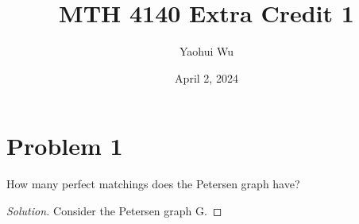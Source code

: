 \documentclass[12pt]{article}
\title{MTH 4140 Extra Credit 1}
\author{Yaohui Wu}
\date{April 2, 2024}
\newenvironment*{solution}{\begin{proof}[Solution]}{\end{proof}}
\begin{document}
\maketitle
\section*{Problem 1}
How many perfect matchings does the Petersen graph have?
\begin{solution}
    Consider the Petersen graph G.
\end{solution}
\end{document}

